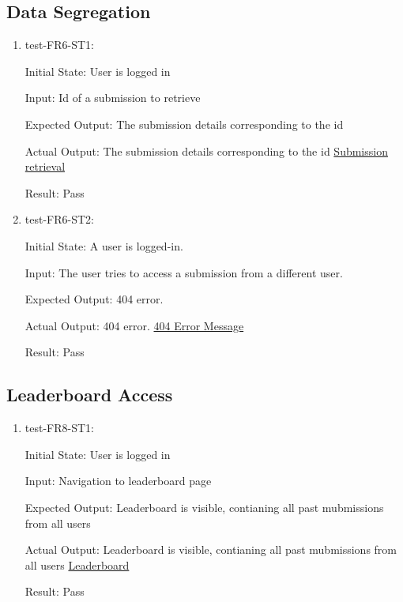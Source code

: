 \documentclass[12pt, titlepage]{article}
\begin{document}
\subsection{Data Segregation}
\begin{enumerate}
    \item test-FR6-ST1:\label{test-FR6-ST1}
    
    Initial State: User is logged in
    
    Input: Id of a submission to retrieve 
    
    Expected Output: The submission details corresponding to the id
    
    Actual Output: The submission details corresponding to the id \href{https://github.com/AidanMariglia/SOCAlgoTestPlatform/blob/main/docs/VnVReport/images/submission_retrieval.png}{Submission retrieval}
    
    Result: Pass
    \item test-FR6-ST2:\label{test-FR6-ST2}
    
    Initial State: A user is logged-in.
    
    Input: The user tries to access a submission from a different user.
    
    Expected Output: 404 error. 
    
    Actual Output: 404 error. \href{https://github.com/AidanMariglia/SOCAlgoTestPlatform/blob/main/docs/VnVReport/images/404_error.png}{404 Error Message}
    
    Result: Pass
\end{enumerate}

\subsection{Leaderboard Access}
\begin{enumerate}
    \item test-FR8-ST1:\label{test-FR8-ST1}
    
    Initial State: User is logged in
    
    Input: Navigation to leaderboard page
    
    Expected Output: Leaderboard is visible, contianing all past mubmissions from all users
    
    Actual Output: Leaderboard is visible, contianing all past mubmissions from all users \href{https://github.com/AidanMariglia/SOCAlgoTestPlatform/blob/main/docs/VnVReport/images/leaderboard.png}{Leaderboard}
    
    Result: Pass
\end{enumerate}
\end{document}
